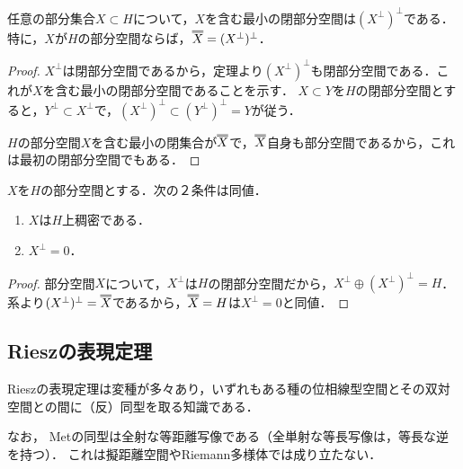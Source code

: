 \documentclass[uplatex,dvipdfmx]{jsreport}
\begin{document}
\begin{corollary}\label{cor-expression-of-closed-linear-span}
    任意の部分集合$X\subset H$について，$X$を含む最小の閉部分空間は$(X^\perp)^\perp$である．
    特に，$X$が$H$の部分空間ならば，$\dbloverline{X}=(X^\perp)^\perp$．
\end{corollary}
\begin{proof}
    $X^\perp$は閉部分空間であるから，定理より$(X^\perp)^\perp$も閉部分空間である．これが$X$を含む最小の閉部分空間であることを示す．
    $X\subset Y$を$H$の閉部分空間とすると，$Y^\perp\subset X^\perp$で，$(X^\perp)^\perp\subset (Y^\perp)^\perp=Y$が従う．

    $H$の部分空間$X$を含む最小の閉集合が$\dbloverline{X}$で，$\dbloverline{X}$自身も部分空間であるから，これは最初の閉部分空間でもある．
\end{proof}

\begin{corollary}[部分空間の稠密性の特徴付け]\label{cor-dense-subspace}
    $X$を$H$の部分空間とする．次の２条件は同値．
    \begin{enumerate}
        \item $X$は$H$上稠密である．
        \item $X^\perp=0$．
    \end{enumerate}
\end{corollary}
\begin{proof}
    部分空間$X$について，$X^\perp$は$H$の閉部分空間だから，$X^\perp\oplus(X^\perp)^\perp=H$．系より$(X^\perp)^\perp=\dbloverline{X}$であるから，$\dbloverline{X}=H$は$X^\perp=0$と同値．
\end{proof}

\subsection{Rieszの表現定理}

\begin{tcolorbox}[colframe=ForestGreen, colback=ForestGreen!10!white,breakable,colbacktitle=ForestGreen!40!white,coltitle=black,fonttitle=\bfseries\sffamily,
title=]
    Rieszの表現定理は変種が多々あり，いずれもある種の位相線型空間とその双対空間との間に（反）同型を取る知識である．

    なお，
    Metの同型は全射な等距離写像である（全単射な等長写像は，等長な逆を持つ）．
    これは擬距離空間やRiemann多様体では成り立たない．
\end{tcolorbox}
\end{document}
